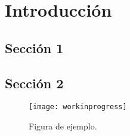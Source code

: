 \chapter{Introducción}
\lipsum[1-2]

\section{Sección 1}
\lipsum[3-6]

\section{Sección 2}
\lipsum[7]

\begin{figure}[!h]
  \center
  \texttt{[image: workinprogress]}
  \caption{Figura de ejemplo.}
  \label{fig:ejemplo}
\end{figure}

\lipsum[8-9]
